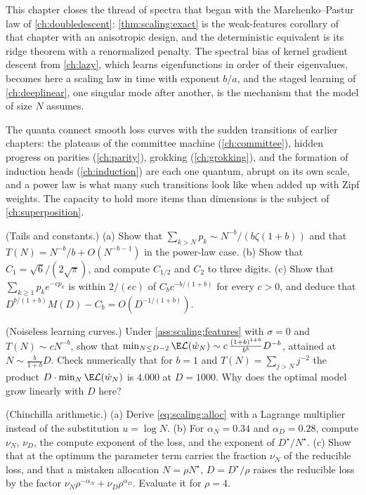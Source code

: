 \begin{refsection}
This chapter closes the thread of spectra that began with the Marchenko--Pastur law of \cref{ch:doubledescent}: \cref{thm:scaling:exact} is the weak-features corollary of that chapter with an anisotropic design, and the deterministic equivalent is its ridge theorem with a renormalized penalty. The spectral bias of kernel gradient descent from \cref{ch:lazy}, which learns eigenfunctions in order of their eigenvalues, becomes here a scaling law in time with exponent $b/a$, and the staged learning of \cref{ch:deeplinear}, one singular mode after another, is the mechanism that the model of size $N$ assumes.

The quanta connect smooth loss curves with the sudden transitions of earlier chapters: the plateaus of the committee machine (\cref{ch:committee}), hidden progress on parities (\cref{ch:parity}), grokking (\cref{ch:grokking}), and the formation of induction heads (\cref{ch:induction}) are each one quantum, abrupt on its own scale, and a power law is what many such transitions look like when added up with Zipf weights. The capacity to hold more items than dimensions is the subject of \cref{ch:superposition}.

\begin{exercises}
\item \consolidation (Tails and constants.) (a) Show that $\sum_{k>N}p_k\sim N^{-b}/(b\zeta(1+b))$ and that $T(N)=N^{-b}/b+O(N^{-b-1})$ in the power-law case. (b) Show that $C_1=\sqrt6/(2\sqrt\pi)$, and compute $C_{1/2}$ and $C_2$ to three digits. (c) Show that $\sum_{k\ge1}p_ke^{-cp_k}$ is within $2/(ec)$ of $C_bc^{-b/(1+b)}$ for every $c>0$, and deduce that $D^{b/(1+b)}M(D)-C_b=O(D^{-1/(1+b)})$.\label{ex:scaling:tails}

\item \consolidation (Noiseless learning curves.) Under \cref{ass:scaling:features} with $\sigma=0$ and $T(N)\sim cN^{-b}$, show that $\min_{N\le D-2}\E\Loss(\hat w_N)\sim c\,\frac{(1+b)^{1+b}}{b^b}D^{-b}$, attained at $N\sim\frac b{1+b}D$. Check numerically that for $b=1$ and $T(N)=\sum_{j>N}j^{-2}$ the product $D\cdot\min_N\E\Loss(\hat w_N)$ is $4.000$ at $D=1000$. Why does the optimal model grow linearly with $D$ here?\label{ex:scaling:noiseless}

\item \consolidation (Chinchilla arithmetic.) (a) Derive \eqref{eq:scaling:alloc} with a Lagrange multiplier instead of the substitution $u=\log N$. (b) For $\alpha_N=0.34$ and $\alpha_D=0.28$, compute $\nu_N$, $\nu_D$, the compute exponent of the loss, and the exponent of $D^\star/N^\star$. (c) Show that at the optimum the parameter term carries the fraction $\nu_N$ of the reducible loss, and that a mistaken allocation $N=\rho N^\star$, $D=D^\star/\rho$ raises the reducible loss by the factor $\nu_N\rho^{-\alpha_N}+\nu_D\rho^{\alpha_D}$. Evaluate it for $\rho=4$.\label{ex:scaling:chinchilla}


\end{exercises}
\end{refsection}
